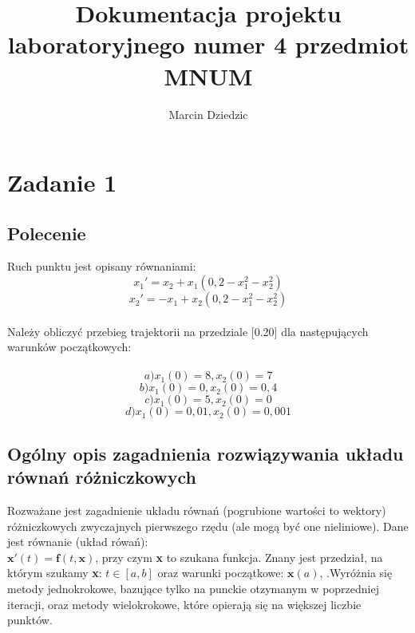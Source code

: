 \documentclass[a4paper, 11pt]{article}
\author{Marcin Dziedzic}
\title{Dokumentacja projektu laboratoryjnego numer 4 przedmiot MNUM}
\begin{document}

\maketitle
\tableofcontents

\section{Zadanie 1}
\subsection{Polecenie}
Ruch punktu jest opisany równaniami:
$$ x_{1}' = x_{2} + x_{1}(0,2 - x_{1}^{2} - x_{2}^{2}) $$
$$ x_{2}' = -x_{1} + x_{2}(0,2 - x_{1}^{2} - x_{2}^{2}) $$\\
Należy obliczyć przebieg trajektorii na przedziale [0.20] dla następujących warunków początkowych: \\
\\
 $$a) x_{1}(0) = 8 ,  x_{2}(0) = 7 $$
 $$b) x_{1}(0) = 0 , x_{2}(0) = 0,4 $$
 $$c) x_{1}(0) = 5 , x_{2}(0) = 0 $$
 $$d) x_{1}(0) = 0,01 , x_{2}(0) = 0,001 $$
 
\subsection{Ogólny opis zagadnienia rozwiązywania układu równań różniczkowych}
Rozważane jest zagadnienie układu równań (pogrubione wartości to wektory) różniczkowych zwyczajnych pierwszego rzędu (ale mogą być one nieliniowe).
Dane jest równanie (układ rówań):\\
$ \mathbf{x'}(t) = \mathbf{f}(t,\mathbf{x}) $, przy czym \textbf{x} to szukana funkcja. Znany jest przedział, na którym szukamy \textbf{x}: $t \in [a,b]$ oraz warunki początkowe: $\mathbf{x}(a)$, .Wyróżnia się metody jednokrokowe, bazujące tylko na punckie otzymanym w poprzedniej iteracji, oraz metody wielokrokowe, które opierają się na większej liczbie punktów.\\
\end{document}
